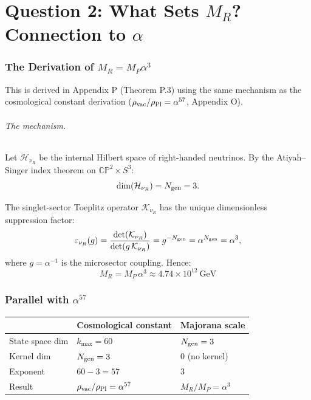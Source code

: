\documentclass[11pt,a4paper]{article}
\begin{document}
\part{Question 2: What Sets $M_R$? Connection to $\alpha$}

\section{The Derivation of $M_R = M_P \alpha^3$}

This is derived in Appendix P (Theorem P.3) using the same mechanism as the
cosmological constant derivation ($\rho_{\rm vac}/\rho_{\rm Pl} = \alpha^{57}$,
Appendix O).

\paragraph{The mechanism.}
Let $\mathcal{H}_{\nu_R}$ be the internal Hilbert space of right-handed
neutrinos. By the Atiyah--Singer index theorem on $\mathbb{CP}^2 \times S^3$:
\begin{equation}
\dim(\mathcal{H}_{\nu_R}) = N_{\rm gen} = 3.
\end{equation}

The singlet-sector Toeplitz operator $\mathcal{K}_{\nu_R}$ has the unique
dimensionless suppression factor:
\begin{equation}
\varepsilon_{\nu_R}(g) = \frac{\det(\mathcal{K}_{\nu_R})}
  {\det(g\,\mathcal{K}_{\nu_R})} = g^{-N_{\rm gen}} = \alpha^{N_{\rm gen}}
  = \alpha^3,
\end{equation}
where $g = \alpha^{-1}$ is the microsector coupling. Hence:
\begin{equation}
\boxed{M_R = M_P\,\alpha^3 \approx 4.74 \times 10^{12}~\text{GeV}}
\end{equation}

\section{Parallel with $\alpha^{57}$}

\begin{center}
\small
\begin{tabular}{lll}
\toprule
& \textbf{Cosmological constant} & \textbf{Majorana scale} \\
\midrule
State space dim & $k_{\max} = 60$ & $N_{\rm gen} = 3$ \\
Kernel dim & $N_{\rm gen} = 3$ & 0 (no kernel) \\
Exponent & $60 - 3 = 57$ & $3$ \\
Result & $\rho_{\rm vac}/\rho_{\rm Pl} = \alpha^{57}$ &
  $M_R/M_P = \alpha^3$ \\
\bottomrule
\end{tabular}
\end{center}
\end{document}
